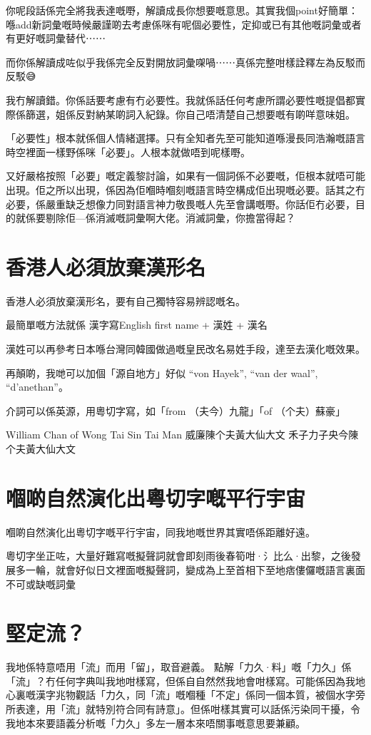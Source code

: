 你呢段話係完全將我表達嘅嘢，解讀成長你想要嘅意思。其實我個point好簡單：喺add新詞彙嘅時候嚴謹啲去考慮係咪有呢個必要性，定抑或已有其他嘅詞彙或者有更好嘅詞彙替代⋯⋯

而你係解讀成咗似乎我係完全反對開放詞彙㗎喎⋯⋯真係完整咁樣詮釋左為反駁而反駁😅


我冇解讀錯。你係話要考慮有冇必要性。我就係話任何考慮所謂必要性嘅提倡都實際係篩選，姐係反對納某啲詞入紀錄。你自己唔清楚自己想要嘅有啲咩意味姐。

「必要性」根本就係個人情緒選擇。只有全知者先至可能知道喺漫長同浩瀚嘅語言時空裡面一樣野係咪「必要」。人根本就做唔到呢樣嘢。

又好嚴格按照「必要」嘅定義黎討論，如果有一個詞係不必要嘅，佢根本就唔可能出現。佢之所以出現，係因為佢嗰時嗰刻嘅語言時空構成佢出現嘅必要。話其之冇必要，係嚴重缺乏想像力同對語言神力敬畏嘅人先至會講嘅嘢。你話佢冇必要，目的就係要剔除佢—係消滅嘅詞彙啊大佬。消滅詞彙，你擔當得起？

\section{香港人必須放棄漢形名}
香港人必須放棄漢形名，要有自己獨特容易辨認嘅名。

最簡單嘅方法就係 漢字寫English first name + 漢姓 + 漢名

漢姓可以再參考日本喺台灣同韓國做過嘅皇民改名易姓手段，達至去漢化嘅效果。

再顛啲，我哋可以加個「源自地方」好似 “von Hayek”, “van der waal”, “d’anethan”。

介詞可以係英源，用粵切字寫，如「from （夫今）九龍」「of （个夫）蘇豪」

William Chan of Wong Tai Sin Tai Man
威廉陳个夫黃大仙大文
禾子力子央今陳个夫黃大仙大文

\section{嗰啲自然演化出粵切字嘅平行宇宙}
嗰啲自然演化出粵切字嘅平行宇宙，同我地嘅世界其實唔係距離好遠。

粵切字坐正咗，大量好難寫嘅擬聲詞就會即刻雨後春筍咁·氵比么·出黎，之後發展多一輪，就會好似日文裡面嘅擬聲詞，變成為上至首相下至地痞僂儸嘅語言裏面不可或缺嘅詞彙


\section{堅定流？}
我地係特意唔用「流」而用「留」，取音避義。
點解「力久·料」嘅「力久」係「流」？冇任何字典叫我地咁樣寫，但係自自然然我地會咁樣寫。可能係因為我地心裏嘅漢字兆物觀話「力久，同「流」嘅嗰種「不定」係同一個本質，被個水字旁所表達，用「流」就特別符合同有詩意」。但係咁樣其實可以話係污染同干擾，令我地本來要語義分析嘅「力久」多左一層本來唔關事嘅意思要兼顧。

